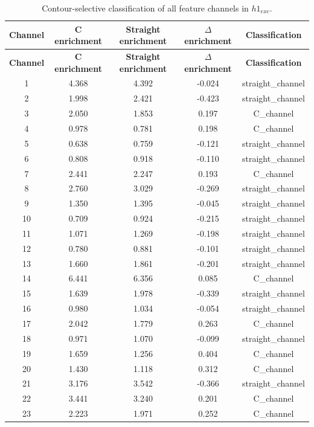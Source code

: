\begin{longtable}{ccccc}
\caption{Contour-selective classification of all feature channels in $h1_{exc}$.}
\label{tab:all_channel_classes}\\
\toprule
\textbf{Channel} & \textbf{C enrichment} & \textbf{Straight enrichment} & \textbf{$\Delta$ enrichment} & \textbf{Classification} \\
\midrule
\endfirsthead
\toprule
\textbf{Channel} & \textbf{C enrichment} & \textbf{Straight enrichment} & \textbf{$\Delta$ enrichment} & \textbf{Classification} \\
\midrule
\endhead
1 & 4.368 & 4.392 & -0.024 & straight_channel \\
2 & 1.998 & 2.421 & -0.423 & straight_channel \\
3 & 2.050 & 1.853 & 0.197 & C_channel \\
4 & 0.978 & 0.781 & 0.198 & C_channel \\
5 & 0.638 & 0.759 & -0.121 & straight_channel \\
6 & 0.808 & 0.918 & -0.110 & straight_channel \\
7 & 2.441 & 2.247 & 0.193 & C_channel \\
8 & 2.760 & 3.029 & -0.269 & straight_channel \\
9 & 1.350 & 1.395 & -0.045 & straight_channel \\
10 & 0.709 & 0.924 & -0.215 & straight_channel \\
11 & 1.071 & 1.269 & -0.198 & straight_channel \\
12 & 0.780 & 0.881 & -0.101 & straight_channel \\
13 & 1.660 & 1.861 & -0.201 & straight_channel \\
14 & 6.441 & 6.356 & 0.085 & C_channel \\
15 & 1.639 & 1.978 & -0.339 & straight_channel \\
16 & 0.980 & 1.034 & -0.054 & straight_channel \\
17 & 2.042 & 1.779 & 0.263 & C_channel \\
18 & 0.971 & 1.070 & -0.099 & straight_channel \\
19 & 1.659 & 1.256 & 0.404 & C_channel \\
20 & 1.430 & 1.118 & 0.312 & C_channel \\
21 & 3.176 & 3.542 & -0.366 & straight_channel \\
22 & 3.441 & 3.240 & 0.201 & C_channel \\
23 & 2.223 & 1.971 & 0.252 & C_channel \\

\end{longtable}
